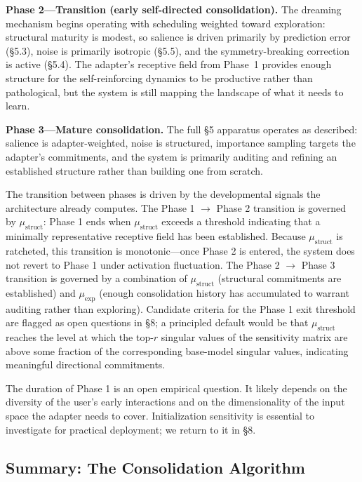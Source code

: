 \documentclass[11pt]{article}
\begin{document}
\textbf{Phase 2---Transition (early self-directed consolidation).} The dreaming mechanism begins operating with scheduling weighted toward exploration: structural maturity is modest, so salience is driven primarily by prediction error (\S 5.3), noise is primarily isotropic (\S 5.5), and the symmetry-breaking correction is active (\S 5.4). The adapter's receptive field from Phase~1 provides enough structure for the self-reinforcing dynamics to be productive rather than pathological, but the system is still mapping the landscape of what it needs to learn.

\textbf{Phase 3---Mature consolidation.} The full \S 5 apparatus operates as described: salience is adapter-weighted, noise is structured, importance sampling targets the adapter's commitments, and the system is primarily auditing and refining an established structure rather than building one from scratch.

The transition between phases is driven by the developmental signals the architecture already computes. The Phase 1 $\to$ Phase 2 transition is governed by $\mu_\text{struct}$: Phase 1 ends when $\mu_\text{struct}$ exceeds a threshold indicating that a minimally representative receptive field has been established. Because $\mu_\text{struct}$ is ratcheted, this transition is monotonic---once Phase 2 is entered, the system does not revert to Phase 1 under activation fluctuation. The Phase 2 $\to$ Phase 3 transition is governed by a combination of $\mu_\text{struct}$ (structural commitments are established) and $\mu_\text{exp}$ (enough consolidation history has accumulated to warrant auditing rather than exploring). Candidate criteria for the Phase 1 exit threshold are flagged as open questions in \S 8; a principled default would be that $\mu_\text{struct}$ reaches the level at which the top-$r$ singular values of the sensitivity matrix are above some fraction of the corresponding base-model singular values, indicating meaningful directional commitments.

The duration of Phase 1 is an open empirical question. It likely depends on the diversity of the user's early interactions and on the dimensionality of the input space the adapter needs to cover. Initialization sensitivity is essential to investigate for practical deployment; we return to it in \S 8.

\subsection{Summary: The Consolidation Algorithm}
\end{document}
